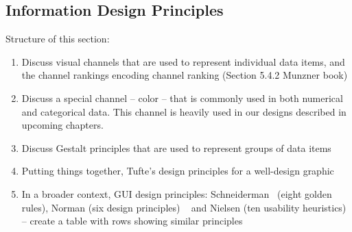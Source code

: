 \subsection{Information Design Principles}
Structure of this section:

\begin{enumerate}
	\item Discuss visual channels that are used to represent individual data items, and the channel rankings	encoding channel ranking (Section 5.4.2 Munzner book)
	\item Discuss a special channel -- color -- that is commonly used in both numerical and categorical data. This channel is heavily used in our designs described in upcoming chapters.
	\item Discuss Gestalt principles that are used to represent groups of data items
	\item Putting things together, Tufte's design principles for a well-design graphic
	\item In a broader context, GUI design principles:  Schneiderman~\cite{Shneiderman2016} (eight golden rules), Norman (six design principles) ~\cite{Norman2002} and	Nielsen (ten usability heuristics)~\cite{Nielsen1994} -- create a table with rows showing similar principles
\end{enumerate}




%
%
%
%

